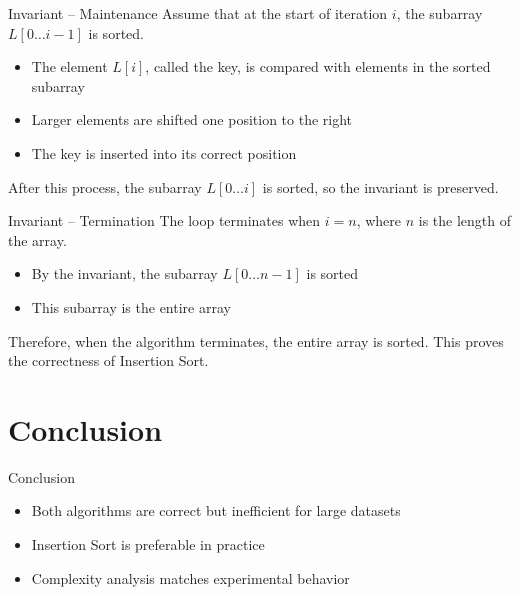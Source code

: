 \documentclass[aspectratio=169]{beamer}
\begin{document}
\begin{frame}{Invariant – Maintenance}
Assume that at the start of iteration \(i\), the subarray
\(L[0 \ldots i-1]\) is sorted.

\medskip
\begin{itemize}
  \item<1-> The element \(L[i]\), called the key, is compared with elements in the sorted subarray
  \item<2-> Larger elements are shifted one position to the right
  \item<3-> The key is inserted into its correct position
\end{itemize}

\medskip
After this process, the subarray \(L[0 \ldots i]\) is sorted, so the
invariant is preserved.
\end{frame}


\begin{frame}{Invariant – Termination}
The loop terminates when \(i = n\), where \(n\) is the length of the array.

\medskip
\begin{itemize}
  \item<1-> By the invariant, the subarray \(L[0 \ldots n-1]\) is sorted
  \item<2-> This subarray is the entire array
\end{itemize}

\medskip
Therefore, when the algorithm terminates, the entire array is sorted.
This proves the correctness of Insertion Sort.
\end{frame}




\section{Conclusion}

\begin{frame}{Conclusion}
\begin{itemize}
    \item<1-> Both algorithms are correct but inefficient for large datasets
    \item<2-> Insertion Sort is preferable in practice
    \item<3-> Complexity analysis matches experimental behavior
\end{itemize}
\end{frame}
\end{document}
